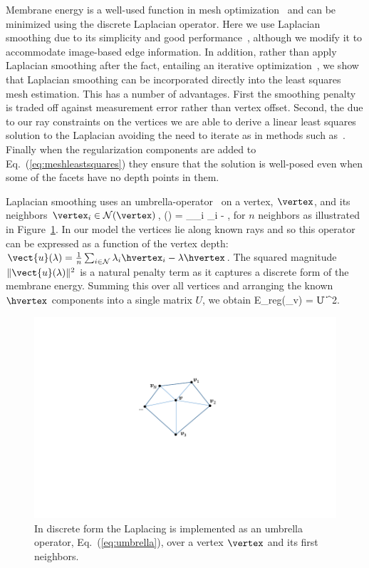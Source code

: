 Membrane energy is a well-used function in mesh optimization~\cite{Kobbelt:1998} and can be minimized using the discrete Laplacian operator.  Here we use Laplacian smoothing due to its simplicity and good performance~\cite{Kobbelt:1998,Ohtake2001789,Chen2005376}, although we modify it to accommodate image-based edge information.  In addition, rather than apply Laplacian smoothing after the fact, entailing an iterative optimization~\cite{Kobbelt:1998}, we show that Laplacian smoothing can be incorporated directly into the least squares mesh estimation.  This has a number of  advantages.  First the smoothing penalty is traded off against measurement error rather than vertex offset.  Second, the due to our ray constraints on the vertices we are able to derive a linear least squares solution to the Laplacian avoiding the need to iterate as in methods such as~\cite{Kobbelt:1998}.  Finally  when the regularization components are added to Eq.~(\ref{eq:meshleastsquares}) they ensure that the solution is well-posed even when some of the facets have no depth points in them.

Laplacian smoothing uses an umbrella-operator~\cite{Kobbelt:1998} on a vertex, $\vertex$, and its neighbors $\vertex_i\in\mathcal{N}(\vertex)$,
\beq
{}(\vertex) = \sum_{\vertex_i\in{}} \vertex_i - \vertex,\label{eq:umbrella}
\eeq
for $n$ neighbors as illustrated in Figure~\ref{fig:laplacian}.  In our model the vertices lie along known rays and so this operator can be expressed as a function of the vertex depth: $\vect{u}(\lambda) = \frac{1}{n}\sum_{i\in\mathcal{N}} \lambda_i \hvertex_i - \lambda\hvertex$.  The squared magnitude $\|\vect{u}(\lambda)\|^2$ is a natural penalty term as it captures a discrete form of the membrane energy.  Summing this over all vertices and arranging the known $\hvertex$ components into a single matrix $U$, we obtain
\beq
E_{reg}(\vlambda_v) = \| U \vlambda \|^2. \label{eq:reg}
\eeq

\begin{figure}
\begin{center}
   \includegraphics[trim=100 110 140 90,clip,width=0.8\linewidth]{Figures/LaplacianFacets}
\end{center}
   \caption{In discrete form the Laplacing is implemented as an umbrella operator, Eq.~(\ref{eq:umbrella}), over a vertex $\vertex$ and its first neighbors.}
\label{fig:laplacian}
\end{figure}

